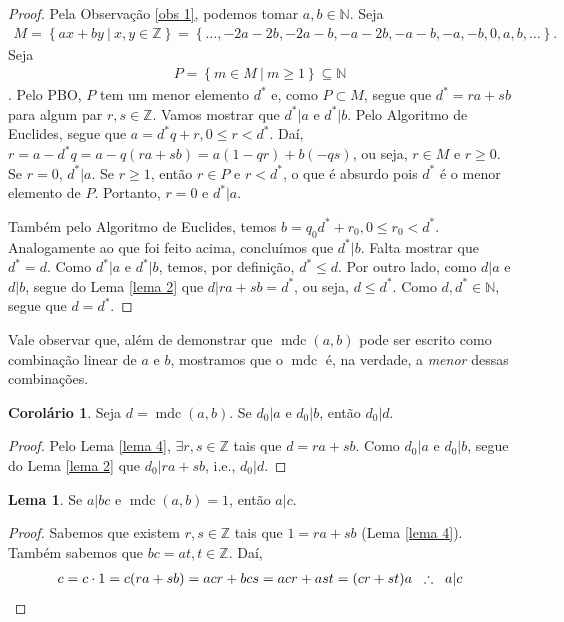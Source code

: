 \documentclass[a4paper,11pt,twoside, leqno]{article}
\DeclareMathOperator{\mdc}{mdc}
\theoremstyle{definition}
\newtheorem{corollary}{Corolário}[theorem]
\newtheorem{lemma}[theorem]{Lema}
\begin{document}
\begin{proof}
	Pela Observação \eqref{obs 1}, podemos tomar $a,b\in\mathbb{N}$. Seja 
	\begin{align*}
	M = \left\{ ax + by \ | \ x,y\in\mathbb{Z} \right\} = \left\{ \dots, -2a - 2b, -2a - b, -a-2b, -a-b, -a, -b, 0, a, b, \dots \right\}.
	\end{align*}
	Seja \begin{align*}
	P = \left\{ m\in M \ | \ m\geq 1 \right\}\subseteq\mathbb{N}
	\end{align*}.
	Pelo PBO, $P$ tem um menor elemento $d^\ast$ e, como $P\subset M$, segue que $d^\ast = ra + sb$ para algum par $r,s\in\mathbb{Z}$. Vamos mostrar que $d^\ast |a$ e $d^\ast |b$. Pelo Algoritmo de Euclides, segue que $a = d^\ast q + r, 0\leq r < d^\ast$. Daí, $r = a - d^\ast q = a - q(ra + sb) = a(1 - qr) + b(-qs)$, ou seja, $r\in M$ e $r\geq 0$. Se $r = 0$, $d^\ast |a$. Se $r\geq 1$, então $r\in P$ e $r<d^\ast$, o que é absurdo pois $d^\ast$ é o menor elemento de $P$. Portanto, $r=0$ e $d^\ast |a$. 
	
	Também pelo Algoritmo de Euclides, temos $b = q_0d^\ast + r_0, 0\leq r_0 < d^\ast$. Analogamente ao que foi feito acima, concluímos que $d^\ast |b$. Falta mostrar que $d^\ast = d$. Como $d^\ast |a$ e $d^\ast |b$, temos, por definição, $d^\ast\leq d$. Por outro lado, como $d|a$ e $d|b$, segue do Lema \eqref{lema 2} que $d|ra+sb = d^\ast$, ou seja, $d\leq d^\ast$. Como $d,d^\ast\in\mathbb{N}$, segue que $d = d^\ast$. 
\end{proof}
\par Vale observar que, além de demonstrar que $\mdc(a,b)$ pode ser escrito como combinação linear de $a$ e $b$, mostramos que o $\mdc$ é, na verdade, a {\em menor} dessas combinações.
\begin{corollary}
	Seja $d = \mdc(a,b)$. Se $d_0|a$ e $d_0|b$, então $d_0|d$.
\end{corollary}
\begin{proof}
	Pelo Lema \eqref{lema 4}, $\exists r,s\in\mathbb{Z}$ tais que $d = ra + sb$. Como $d_0|a$ e $d_0|b$, segue do Lema \eqref{lema 2} que $d_0|ra + sb$, i.e., $d_0|d$.
\end{proof}
\begin{lemma}
	\label{lema 5}
	Se $a|bc$ e $\mdc(a,b) = 1$, então $a|c$.
\end{lemma}
\begin{proof}
	Sabemos que existem $r,s\in\mathbb{Z}$ tais que $1 = ra+sb$ (Lema \eqref{lema 4}). Também sabemos que $bc = at, t\in\mathbb{Z}$. Daí, 
	\begin{align*}
	c = c\cdot 1 = c(ra + sb) = acr + bcs = acr + ast = (cr + st)a \hspace{0.2cm} \therefore \hspace{0.2cm}a|c
	\end{align*}
\end{proof}
\end{document}
